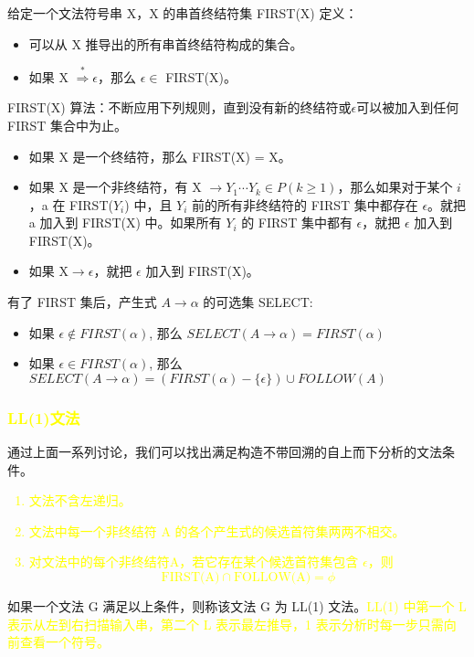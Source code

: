 给定一个文法符号串 X，X 的串首终结符集 FIRST(X) 定义：
\begin{itemize}
    \item 可以从 X 推导出的所有串首终结符构成的集合。
    \item 如果 X $\stackrel{*}{\Rightarrow} \epsilon$，那么 $\epsilon \in$ FIRST(X)。
\end{itemize}

FIRST(X) 算法：不断应用下列规则，直到没有新的终结符或$\epsilon$可以被加入到任何 FIRST 集合中为止。
\begin{itemize}
    \item 如果 X 是一个终结符，那么 FIRST(X) = X。
    \item 如果 X 是一个非终结符，有 X $\rightarrow Y_1 \cdots Y_k \in P (k\geq 1) $，那么如果对于某个 $i$，a 在 FIRST($Y_i$) 中，且 $Y_i$ 前的所有非终结符的 FIRST 集中都存在 $\epsilon$。就把 a 加入到 FIRST(X) 中。如果所有 $Y_i$ 的 FIRST 集中都有 $\epsilon$，就把 $\epsilon$ 加入到 FIRST(X)。
    \item 如果 X$\rightarrow \epsilon$，就把 $\epsilon$ 加入到 FIRST(X)。
\end{itemize}

有了 FIRST 集后，产生式 $A \rightarrow \alpha$ 的可选集 SELECT:
\begin{itemize}
    \item 如果 $\epsilon \notin FIRST(\alpha)$, 那么 $SELECT(A\rightarrow\alpha) = FIRST(\alpha)$
    \item 如果 $\epsilon \in FIRST(\alpha)$, 那么 $SELECT(A\rightarrow\alpha) = (FIRST(\alpha) - \{\epsilon\}) \cup FOLLOW(A)$
\end{itemize}

\newpage

\subsubsection{\textcolor{mark}{LL(1)文法}}

通过上面一系列讨论，我们可以找出满足构造不带回溯的自上而下分析的文法条件。
\textcolor{mark}{
    \begin{enumerate}
        \item 文法不含左递归。
        \item 文法中每一个非终结符 A 的各个产生式的候选首符集两两不相交。
        \item 对文法中的每个非终结符A，若它存在某个候选首符集包含 $\epsilon$，则
              \[ \text{FIRST(A)} \cap \text{FOLLOW(A)} = \phi \]
    \end{enumerate}}
如果一个文法 G 满足以上条件，则称该文法 G 为 LL(1) 文法。\textcolor{mark}{LL(1) 中第一个 L 表示从左到右扫描输入串，第二个 L 表示最左推导，1 表示分析时每一步只需向前查看一个符号。}

